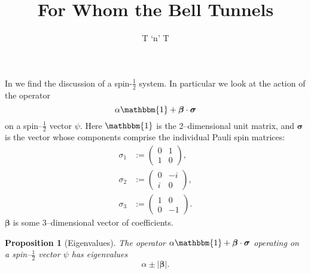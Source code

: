 \documentclass[12pt]{article}
\title{For Whom the Bell Tunnels}
\author{T `n' T}
\newtheorem{prop}[thm]{Proposition}
\begin{document}
\maketitle

In \cite[p.448]{Bell1966} we find the discussion of a spin-$\frac{1}{2}$ system.  In particular we look at the action of the operator
\begin{displaymath}
  \alpha \mathbbm{1} + \bm{\beta} \cdot \bm{\sigma}
\end{displaymath}
on a spin--$\frac{1}{2}$ vector $\psi$.  Here $\mathbbm{1}$ is the 2--dimensional unit matrix, and $\bm{\sigma}$ is the vector whose components comprise the individual Pauli spin matrices:
\begin{align*}
  \sigma_1 &:= \begin{pmatrix}
                 0 & 1 \\
                 1 & 0
               \end{pmatrix},
              \\
  \sigma_2 &:= \begin{pmatrix}
                 0 & -i \\
                 i & 0
               \end{pmatrix},
              \\
  \sigma_3 &:= \begin{pmatrix}
                 1 & 0 \\
                 0 & -1
               \end{pmatrix}.
\end{align*}
$\bm{\beta}$ is some 3--dimensional vector of coefficients.

\begin{prop}[Eigenvalues]
  The operator $\alpha \mathbbm{1} + \bm{\beta} \cdot \bm{\sigma}$ operating on a spin--$\frac{1}{2}$ vector $\psi$ has eigenvalues
  \begin{displaymath}
    \alpha \pm |\bm{\beta}|.
  \end{displaymath}
\end{prop}
\end{document}
